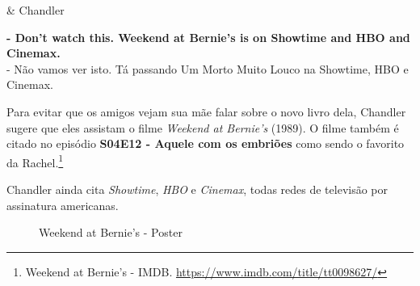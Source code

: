 \begin{tcolorbox}[enhanced,center upper,
    drop fuzzy shadow southeast, boxrule=0.3pt,
    lower separated=false, breakable,
    colframe=black!30!dialogoBorder,colback=white]
\begin{minipage}[c]{0.16\linewidth}
   & \centering \scriptsize{Chandler}
\end{minipage}
\hfill
\begin{minipage}[c]{0.8\linewidth}
  \textbf{- Don't watch this. Weekend at Bernie's is on Showtime and HBO and Cinemax.}\\
  - Não vamos ver isto. Tá passando Um Morto Muito Louco na Showtime, HBO e Cinemax.
\end{minipage}
\end{tcolorbox}

\saveparinfos
\noindent
\begin{minipage}[c]{0.5\textwidth}\useparinfo

Para evitar que os amigos vejam sua mãe falar sobre o novo livro dela,
Chandler sugere que eles assistam o filme \emph{Weekend at Bernie's}
(1989). O filme também é citado no episódio
\textbf{\textcolor{primarycolor}{S04E12 - Aquele com os embriões}} como
sendo o favorito da Rachel.\footnote{\sloppy Weekend at Bernie’s - IMDB. \url{https://www.imdb.com/title/tt0098627/}}

Chandler ainda cita \emph{Showtime}, \emph{HBO} e \emph{Cinemax}, todas
redes de televisão por assinatura americanas.

\end{minipage}\hfill
\begin{minipage}[c]{0.5\textwidth}

\begin{figure}
  \centering
    \caption{Weekend at Bernie’s - Poster\label{fig:weekend-at-bernie-s-poster}}
\end{figure}

\end{minipage}

